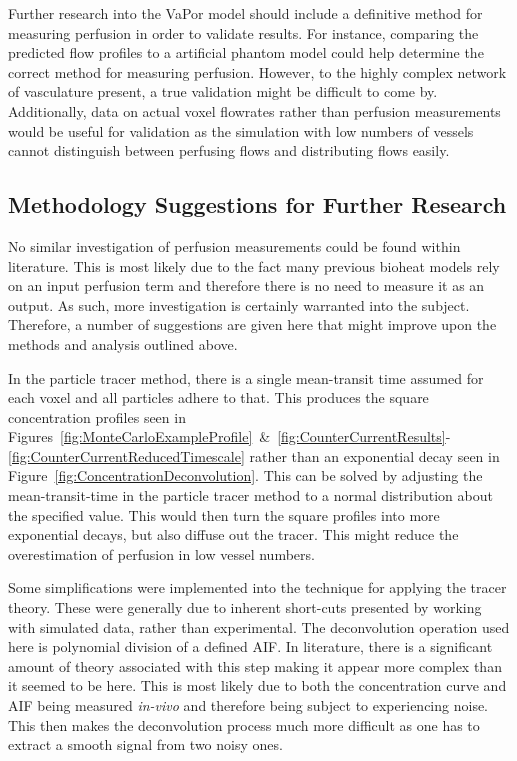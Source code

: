 \documentclass[11pt,english,a4paper,twoside,openright]{report}
\begin{document}
{{{{{{{Further research into the VaPor model should include a definitive method for measuring perfusion in order to validate results. For instance, comparing the predicted flow profiles to a artificial phantom model could help determine the correct method for measuring perfusion. However, to the highly complex network of vasculature present, a true validation might be difficult to come by. Additionally, data on actual voxel flowrates rather than perfusion measurements would be useful for validation as the simulation with low numbers of vessels cannot distinguish between perfusing flows and distributing flows easily. 

\subsection{Methodology Suggestions for Further Research}

No similar investigation of perfusion measurements could be found within literature. This is most likely due to the fact many previous bioheat models rely on an input perfusion term and therefore there is no need to measure it as an output. As such, more investigation is certainly warranted into the subject. Therefore, a number of suggestions are given here that might improve upon the methods and analysis outlined above.

In the particle tracer method, there is a single mean-transit time assumed for each voxel and all particles adhere to that. This produces the square concentration profiles seen in Figures~\ref{fig:MonteCarloExampleProfile}~\&~\ref{fig:CounterCurrentResults}-\ref{fig:CounterCurrentReducedTimescale} rather than an exponential decay seen in Figure~\ref{fig:ConcentrationDeconvolution}. This can be solved by adjusting the mean-transit-time in the particle tracer method to a normal distribution about the specified value. This would then turn the square profiles into more exponential decays, but also diffuse out the tracer. This might reduce the overestimation of perfusion in low vessel numbers.

Some simplifications were implemented into the technique for applying the tracer theory. These were generally due to inherent short-cuts presented by working with simulated data, rather than experimental. The deconvolution operation used here is polynomial division of a defined AIF. In literature, there is a significant amount of theory associated with this step \cite{ostergaard1996high} making it appear more complex than it seemed to be here. This is most likely due to both the concentration curve and AIF being measured \textit{in-vivo} and therefore being subject to experiencing noise. This then makes the deconvolution process much more difficult as one has to extract a smooth signal from two noisy ones. 

}}}}}}}
\end{document}
